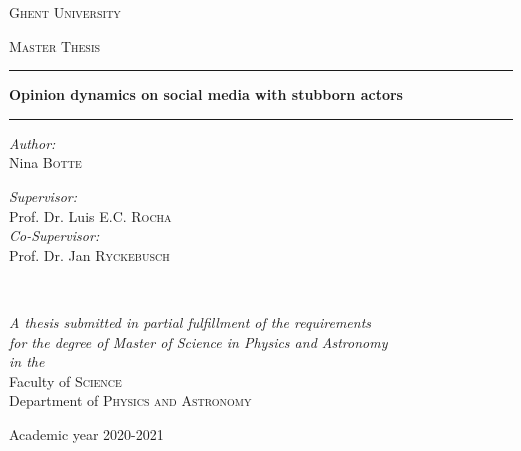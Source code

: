 \documentclass[11 pt , letterpaper , twoside , openright]{book}
\begin{document}
\frontmatter
{}

\begin{titlepage}
\begin{center}

\vspace*{.06\textheight}
{\scshape\LARGE \textcolor{NavyBlue}{Ghent University}\par}\vspace{1.5cm} %
\textsc{\Large Master Thesis}\\[0.5cm] %

\hrule %
\vspace{0.4cm} 
{\huge \bfseries Opinion dynamics on social media with stubborn actors\par}\vspace{0.4cm} %
\hrule %
\vspace{1.5cm} 
 
\begin{minipage}[t]{0.4\textwidth}
\begin{flushleft} \large
\emph{Author:}\\
\textcolor{NavyBlue}{Nina \textsc{Botte}} %
\end{flushleft}
\end{minipage}
\begin{minipage}[t]{0.4\textwidth}
\begin{flushright} \large
\emph{Supervisor:} \\
\textcolor{NavyBlue}{Prof. Dr. Luis E.C. \textsc{Rocha}}\\
\emph{Co-Supervisor:}\\
\textcolor{NavyBlue}{Prof. Dr. Jan \textsc{Ryckebusch}}
\end{flushright}
\end{minipage}\\[3cm]
 
\vfill

\large \textit{A thesis submitted in partial fulfillment of the requirements\\ for the degree of Master of Science in Physics and Astronomy}\\[0.3cm] %
\textit{in the}\\[0.4cm]
\textcolor{NavyBlue}{Faculty of \textsc{Science}}\\\textcolor{NavyBlue}{Department of \textsc{Physics and Astronomy}}\\[2cm] %
 
\vfill

{\large Academic year 2020-2021}\\[4cm] %
\vfill
\end{center}
\end{titlepage}
\end{document}
